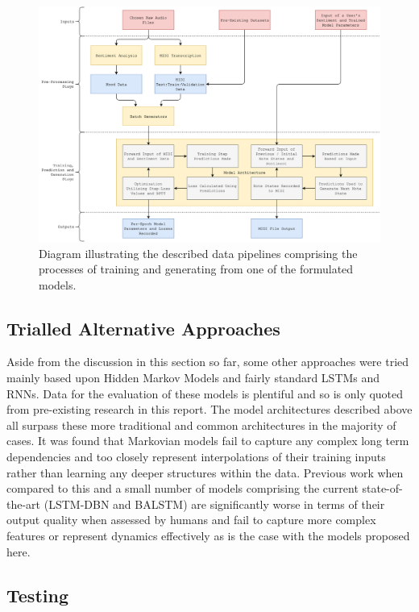 \documentclass[12pt,]{article}
\begin{document}
\begin{figure}
\centering
\includegraphics{Images/processdiagram.png}
\caption{Diagram illustrating the described data pipelines comprising
the processes of training and generating from one of the formulated
models.}
\end{figure}

\hypertarget{trialled-alternative-approaches}{%
\subsection{Trialled Alternative
Approaches}\label{trialled-alternative-approaches}}

Aside from the discussion in this section so far, some other approaches
were tried mainly based upon Hidden Markov Models and fairly standard
LSTMs and RNNs. Data for the evaluation of these models is plentiful and
so is only quoted from pre-existing research in this report. The model
architectures described above all surpass these more traditional and
common architectures in the majority of cases. It was found that
Markovian models fail to capture any complex long term dependencies and
too closely represent interpolations of their training inputs rather
than learning any deeper structures within the data. Previous work when
compared to this and a small number of models comprising the current
state-of-the-art (LSTM-DBN and BALSTM) are significantly worse in terms
of their output quality when assessed by humans and fail to capture more
complex features or represent dynamics effectively as is the case with
the models proposed here.

\hypertarget{testing}{%
\subsection{Testing}\label{testing}}
\end{document}
